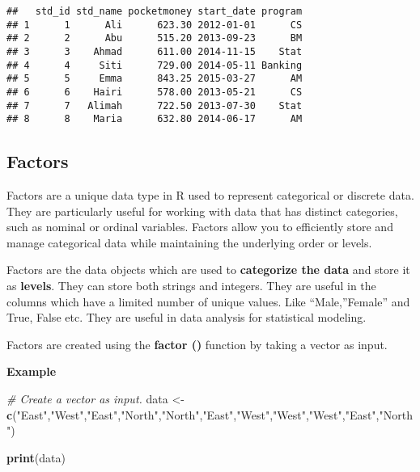 \documentclass[
]{article}
\newenvironment{Shaded}{\begin{snugshade}}{\end{snugshade}}
\newcommand{\CommentTok}[1]{\textcolor[rgb]{0.56,0.35,0.01}{\textit{#1}}}
\newcommand{\FunctionTok}[1]{\textcolor[rgb]{0.13,0.29,0.53}{\textbf{#1}}}
\newcommand{\NormalTok}[1]{#1}
\newcommand{\OtherTok}[1]{\textcolor[rgb]{0.56,0.35,0.01}{#1}}
\newcommand{\StringTok}[1]{\textcolor[rgb]{0.31,0.60,0.02}{#1}}
\begin{document}
\begin{verbatim}
##   std_id std_name pocketmoney start_date program
## 1      1      Ali      623.30 2012-01-01      CS
## 2      2      Abu      515.20 2013-09-23      BM
## 3      3    Ahmad      611.00 2014-11-15    Stat
## 4      4     Siti      729.00 2014-05-11 Banking
## 5      5     Emma      843.25 2015-03-27      AM
## 6      6    Hairi      578.00 2013-05-21      CS
## 7      7   Alimah      722.50 2013-07-30    Stat
## 8      8    Maria      632.80 2014-06-17      AM
\end{verbatim}

\hypertarget{factors}{%
\subsection{Factors}\label{factors}}

Factors are a unique data type in R used to represent categorical or
discrete data. They are particularly useful for working with data that
has distinct categories, such as nominal or ordinal variables. Factors
allow you to efficiently store and manage categorical data while
maintaining the underlying order or levels.

Factors are the data objects which are used to \textbf{categorize the
data} and store it as \textbf{levels}. They can store both strings and
integers. They are useful in the columns which have a limited number of
unique values. Like ``Male,''Female'' and True, False etc. They are
useful in data analysis for statistical modeling.

Factors are created using the \textbf{factor ()} function by taking a
vector as input.

\textbf{Example}

\begin{Shaded}
\begin{Highlighting}[]
\CommentTok{\# Create a vector as input.}
\NormalTok{data }\OtherTok{\textless{}{-}} \FunctionTok{c}\NormalTok{(}\StringTok{"East"}\NormalTok{,}\StringTok{"West"}\NormalTok{,}\StringTok{"East"}\NormalTok{,}\StringTok{"North"}\NormalTok{,}\StringTok{"North"}\NormalTok{,}\StringTok{"East"}\NormalTok{,}\StringTok{"West"}\NormalTok{,}\StringTok{"West"}\NormalTok{,}\StringTok{"West"}\NormalTok{,}\StringTok{"East"}\NormalTok{,}\StringTok{"North"}\NormalTok{)}

\FunctionTok{print}\NormalTok{(data)}
\end{Highlighting}
\end{Shaded}
\end{document}
